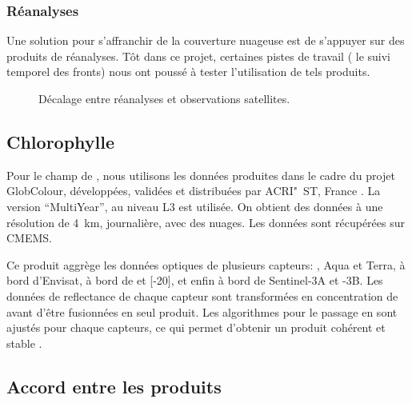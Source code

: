 \documentclass[index]{subfiles}
\begin{document}
\subsubsection{Réanalyses}
\label{sec:donnees-sst-reanalyses}

Une solution pour s'affranchir de la couverture nuageuse est de s'appuyer sur des produits de réanalyses.
Tôt dans ce projet, certaines pistes de travail ( le suivi temporel des fronts) nous ont poussé à tester l'utilisation de tels produits.


\begin{figure}
  \caption{Décalage entre réanalyses et observations satellites.}
  \label{fig:decalage-reanalyses}
\end{figure}

\subsection{Chlorophylle}
\label{sec:donnees-chl}

Pour le champ de , nous utilisons les données produites dans le cadre du projet GlobColour, développées, validées et distribuées par ACRI"~ST, France \parencite{maritorena_2002}.
La version \enquote{MultiYear}, au niveau L3 est utilisée.
On obtient des données à une résolution de \qty{4}{\km}, journalière, avec des nuages.
Les données sont récupérées sur \gls{CMEMS}.

Ce produit aggrège les données optiques de plusieurs capteurs: ,  Aqua et Terra,  à bord d'Envisat,  à bord de  et [-20], et enfin  à bord de Sentinel-3A et -3B.
Les données de reflectance de chaque capteur sont transformées en concentration de  avant d'être fusionnées en seul produit.
Les algorithmes pour le passage en  sont ajustés pour chaque capteurs, ce qui permet d'obtenir un produit cohérent et stable \parencite{garnesson_2019}.


\subsection{Accord entre les produits}
\end{document}
